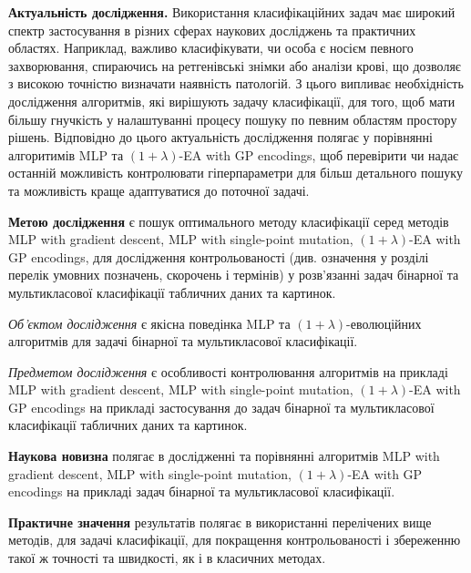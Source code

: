 \textbf{Актуальність дослідження.} Використання класифікаційних задач має широкий спектр застосування в різних сферах наукових досліджень та практичних областях. Наприклад, важливо класифікувати, чи особа є носієм певного захворювання, спираючись на ретгенівські знімки або аналізи крові, що дозволяє з високою точністю визначати наявність патологій. З цього випливає необхідність дослідження алгоритмів, які вирішують задачу класифікації, для того, щоб мати більшу гнучкість у налаштуванні процесу пошуку по певним областям простору рішень. Відповідно до цього актуальність дослідження полягає у порівнянні алгоритимів MLP та $(1+\lambda)$-EA with GP encodings, щоб перевірити чи надає останній можливість контролювати гіперпараметри для більш детального пошуку та можливість краще адаптуватися до поточної задачі.

\textbf{Метою дослідження} є пошук оптимального методу класифікації серед методів MLP with gradient descent, MLP with single-point mutation, $(1+\lambda)$-EA with GP encodings, для дослідження контрольованості (див. означення у розділі перелік умовних позначень, скорочень і термінів) у розв'язанні задач бінарної та мультикласової класифікації табличних даних та картинок.

\emph{Об'єктом дослідження} є якісна поведінка MLP та $(1+\lambda)$-еволюційних алгоритмів для задачі бінарної та мультикласової класифікації.

\emph{Предметом дослідження} є особливості контролювання алгоритмів на прикладі MLP with gradient descent, MLP with single-point mutation, $(1+\lambda)$-EA with GP encodings на прикладі застосування до задач бінарної та мультикласової класифікації табличних даних та картинок.

\textbf{Наукова новизна} полягає в дослідженні та порівнянні алгоритмів MLP with gradient descent, MLP with single-point mutation, $(1+\lambda)$-EA with GP encodings на прикладі задач бінарної та мультикласової класифікації.

\textbf{Практичне значення} результатів полягає в використанні перелічених вище методів, для задачі класифікації, для покращення контрольованості і збереженню такої ж точності та швидкості, як і в класичних методах.